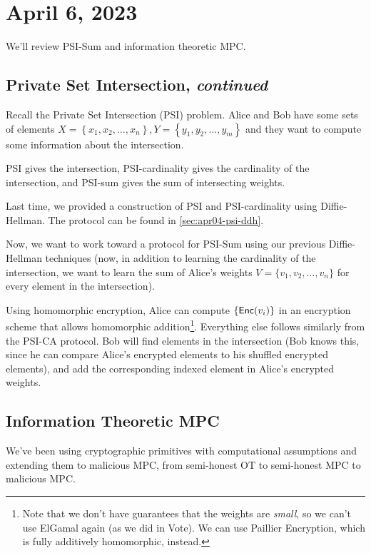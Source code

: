 \section{April 6, 2023}
\label{20230406}
We'll review PSI-Sum and information theoretic MPC.

\subsection{Private Set Intersection, \emph{continued}}
Recall the Private Set Intersection (PSI) problem. Alice and Bob have some sets of elements $X = \left\{ x_1, x_2, \dots, x_n \right\}, Y = \left\{ y_1, y_2, \dots, y_m \right\}$ and they want to compute some information about the intersection.

PSI gives the intersection, PSI-cardinality gives the cardinality of the intersection, and PSI-sum gives the sum of intersecting weights.

Last time, we provided a construction of PSI and PSI-cardinality using Diffie-Hellman. The protocol can be found in \cref{sec:apr04-psi-ddh}.


Now, we want to work toward a protocol for PSI-Sum using our previous Diffie-Hellman techniques (now, in addition to learning the cardinality of the intersection, we want to learn the sum of Alice's weights $V = \{v_1, v_2, \dots, v_n\}$ for every element in the intersection).

Using homomorphic encryption, Alice can compute $\{\operatorname{\mathsf{Enc}}(v_i)\}$ in an encryption scheme that allows homomorphic addition\footnote{Note that we don't have guarantees that the weights are \emph{small}, so we can't use ElGamal again (as we did in Vote). We can use Paillier Encryption, which is fully additively homomorphic, instead. }. Everything else follows similarly from the PSI-CA protocol. Bob will find elements in the intersection (Bob knows this, since he can compare Alice's encrypted elements to his shuffled encrypted elements), and add the corresponding indexed element in Alice's encrypted weights.


\subsection{Information Theoretic MPC}
We've been using cryptographic primitives with computational assumptions and extending them to malicious MPC, from semi-honest OT to semi-honest MPC to malicious MPC.

